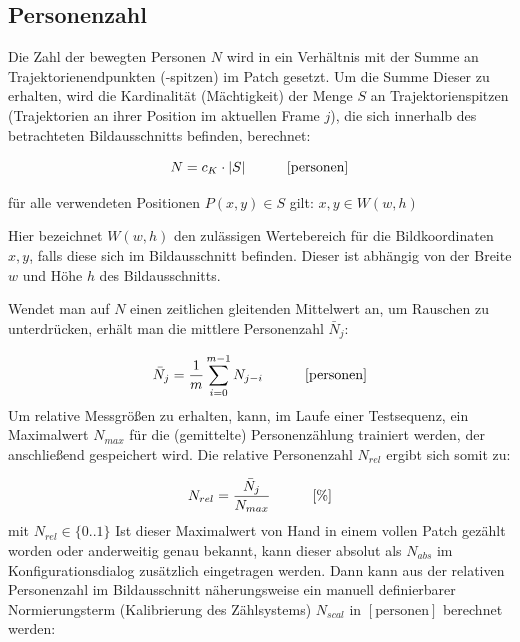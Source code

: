 \newpage

\subsection{Personenzahl}
Die Zahl der bewegten Personen $N$ wird in ein Verhältnis mit der Summe an Trajektorienendpunkten (-spitzen) im Patch gesetzt. Um die Summe Dieser zu erhalten, wird die Kardinalität (Mächtigkeit) der Menge $S$ an Trajektorienspitzen (Trajektorien an ihrer Position im aktuellen Frame $j$), die sich innerhalb des betrachteten Bildausschnitts befinden, berechnet:

\begin{equation}
N = c_K\cdot |S| \hskip 30pt [\text{personen}]
\end{equation}
\vskip 5pt
\begin{flushleft}
für alle verwendeten Positionen $P(x,y)\in S$ gilt: $x,y\in W(w,h)$
\end{flushleft}
Hier bezeichnet $W(w,h)$ den zulässigen Wertebereich für die Bildkoordinaten $x,y$, falls diese sich im Bildausschnitt befinden. Dieser ist abhängig von der Breite $w$ und Höhe $h$ des Bildausschnitts.
\vskip 5pt

Wendet man auf $N$ einen zeitlichen gleitenden Mittelwert an, um Rauschen zu unterdrücken, erhält man die mittlere Personenzahl $\bar{N}_j$:

\begin{equation}
\bar{N}_j = \frac{1}{m}\sum_{i=0}^{m-1}{N_{j-i}} \hskip 30pt [\text{personen}]
\end{equation}
\vskip 10pt
Um relative Messgrößen zu erhalten, kann, im Laufe einer Testsequenz, ein Maximalwert $N_{max}$ für die (gemittelte) Personenzählung trainiert werden, der anschließend gespeichert wird. Die relative Personenzahl $N_{rel}$ ergibt sich somit zu:

\begin{equation}
    N_{rel}=\frac{\bar{N}_j}{N_{max}} \hskip 30pt [\%]
\end{equation}
mit $N_{rel}\in \{0..1\}$
\vskip 10pt
Ist dieser Maximalwert von Hand in einem vollen Patch gezählt worden oder anderweitig genau bekannt, kann dieser absolut als $N_{abs}$ im Konfigurationsdialog zusätzlich eingetragen werden. Dann kann aus der relativen Personenzahl im Bildausschnitt näherungsweise ein manuell definierbarer Normierungsterm (Kalibrierung des Zählsystems) $N_{scal}$ in $[\text{personen}]$ berechnet werden: 

